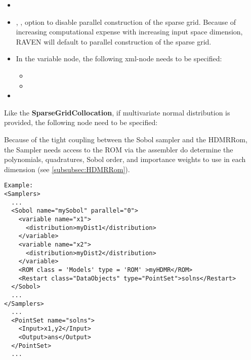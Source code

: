 \begin{itemize}
\itemsep0em
\item \nameDescription
\item {}, , option to disable parallel construction of the sparse grid.  Because of increasing computational expense with increasing input space dimension, RAVEN will default to parallel construction of the sparse grid.
\end{itemize}
\begin{itemize}
\item \variableDescription
 In the variable node, the following xml-node needs to be specified:
 \begin{itemize}
    \item \distributionDescription
    \item \functionDescription
 \end{itemize}
\item \constantVariablesDescription
\end{itemize}

Like the \textbf{SparseGridCollocation}, if multivariate normal distribution is provided, the following node need to be specified:

Because of the tight coupling between the Sobol sampler and the HDMRRom, the Sampler needs access to the ROM via the assembler do determine the polynomials, quadratures, Sobol order, and importance weights to use in each dimension (see \ref{subsubsec:HDMRRom}).


\footnotesize
\begin{lstlisting}[style=XML]
Example:
<Samplers>
  ...
  <Sobol name="mySobol" parallel="0">
    <variable name="x1">
      <distribution>myDist1</distribution>
    </variable>
    <variable name="x2">
      <distribution>myDist2</distribution>
    </variable>
    <ROM class = 'Models' type = 'ROM' >myHDMR</ROM>
    <Restart class="DataObjects" type="PointSet">solns</Restart>
  </Sobol>
  ...
</Samplers>
  ...
  <PointSet name="solns">
    <Input>x1,y2</Input>
    <Output>ans</Output>
  </PointSet>
  ...
\end{lstlisting}
 \normalsize


